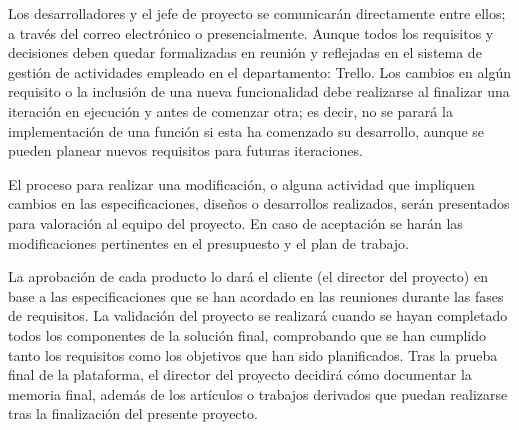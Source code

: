 Los desarrolladores y el jefe de proyecto se comunicarán directamente entre ellos; a través del correo electrónico o presencialmente. Aunque todos los requisitos y decisiones deben quedar formalizadas en reunión y reflejadas en el sistema de gestión de actividades empleado en el departamento: Trello. Los cambios en algún requisito o la inclusión de una nueva funcionalidad debe realizarse al finalizar una iteración en ejecución y antes de comenzar otra; es decir, no se parará la implementación de una función si esta ha comenzado su desarrollo, aunque se pueden planear nuevos requisitos para futuras iteraciones. 

El proceso para realizar una modificación, o alguna actividad que impliquen cambios en las especificaciones, diseños o desarrollos realizados, serán presentados para valoración al equipo del proyecto. En caso de aceptación se harán las modificaciones pertinentes en el presupuesto y el plan de trabajo.

La aprobación de cada producto lo dará el cliente (el director del proyecto) en base a las especificaciones que se han acordado en las reuniones durante las fases de requisitos. La validación del proyecto se realizará cuando se hayan completado todos los componentes de la solución final, comprobando que se han cumplido tanto los requisitos como los objetivos que han sido planificados. Tras la prueba final de la plataforma, el director del proyecto decidirá cómo documentar la memoria final, además de los artículos o trabajos derivados que puedan realizarse tras la finalización del presente proyecto.

